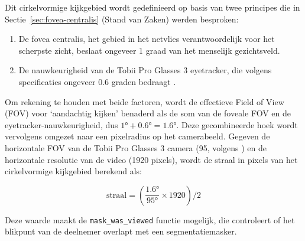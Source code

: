 Dit cirkelvormige kijkgebied wordt gedefinieerd op basis van twee principes die in 
Sectie~\ref{sec:fovea-centralis} (Stand van Zaken) werden besproken:
\begin{enumerate}
    \item De fovea centralis, het gebied in het netvlies verantwoordelijk voor het scherpste zicht, beslaat ongeveer 1 graad van het menselijk gezichtsveld.
    \item De nauwkeurigheid van de Tobii Pro Glasses 3 eyetracker, die volgens specificaties ongeveer 0.6 graden bedraagt \autocite{Tobii2025a}.
\end{enumerate}

Om rekening te houden met beide factoren, wordt de effectieve Field of View (FOV) voor 
`aandachtig kijken' benaderd als de som van de foveale FOV en de eyetracker-nauwkeurigheid, dus \(1° + 0.6° = 1.6° \).
Deze gecombineerde hoek wordt vervolgens omgezet naar een pixelradius op het camerabeeld. 
Gegeven de horizontale FOV van de Tobii Pro Glasses 3 camera (95\textdegree, volgens \textcite{Tobii2025a}) en de horizontale resolutie van de video (1920 pixels),
wordt de straal in pixels van het cirkelvormige kijkgebied berekend als:

\[
\text{straal} = \left( \frac{\text{1.6°}}{\text{95°}} \times \text{1920} \right) / 2
\]

Deze waarde maakt de \texttt{mask\_was\_viewed} functie mogelijk, die controleert of het blikpunt van de deelnemer overlapt met een segmentatiemasker.

